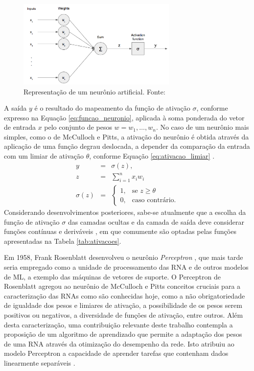\begin{figure}[ht]
	\centering
	\caption{Representação de um neurônio artificial. Fonte: \cite{neuronio:perceptron}}
	\label{fig:neuronio}
	\includegraphics[width=0.7\textwidth]{img/perceptron.png}
\end{figure}
A saída $y$ é o resultado do mapeamento da função de ativação $\sigma$, conforme expresso na Equação \ref{eq:funcao_neuronio}, aplicada à soma ponderada do vetor de entrada $x$ pelo conjunto de pesos $w = w_1, \ldots, w_n$. No caso de um neurônio mais simples, como o de McCulloch e Pitts, a ativação do neurônio é obtida através da aplicação de uma função degrau deslocada, a depender da comparação da entrada com um limiar de ativação $\theta$, conforme Equação \ref{eq:ativacao_limiar} \cite{mcculloch1943logical}.
\begin{eqnarray}
	y &=& \sigma\left( z\right),\label{eq:funcao_neuronio}\\
	z &=& \sum_{i=1}^n x_i w_i\\
	\sigma(z) &=& \begin{cases}
		1, & \text{se } z \geq \theta\label{eq:ativacao_limiar}\\
		0, & \text{caso contrário.}
	\end{cases}
\end{eqnarray}
Considerando desenvolvimentos posteriores, sabe-se atualmente que a escolha da função de ativação $\sigma$ das camadas ocultas e da camada de saída deve considerar funções contínuas e deriváveis \cite{hornik1991approximation}, em que comumente são optadas pelas funções apresentadas na Tabela  \ref{tab:ativacoes}.

 

Em 1958, Frank Rosenblatt desenvolveu o neurônio \emph{Perceptron} \cite{rosenblatt1958perceptron}, que mais tarde seria empregado como a unidade de processamento das RNA e de outros modelos de ML, a exemplo das máquinas de vetores de suporte. O Perceptron de Rosenblatt agregou ao neurônio de McCulloch e Pitts conceitos cruciais para a caracterização das RNAs como são conhecidas hoje, como a não obrigatoriedade de igualdade dos pesos e limiares de ativação, a possibilidade de os pesos serem positivos ou negativos, a diversidade de funções de ativação, entre outros. Além desta caracterização, uma contribuição relevante deste trabalho contempla a proposição de um algoritmo de aprendizado que permite a adaptação dos pesos de uma RNA através da otimização do desempenho da rede. Isto atribuiu ao modelo Perceptron a capacidade de aprender tarefas que contenham dados linearmente separáveis \cite{Teresa:Livro}.

